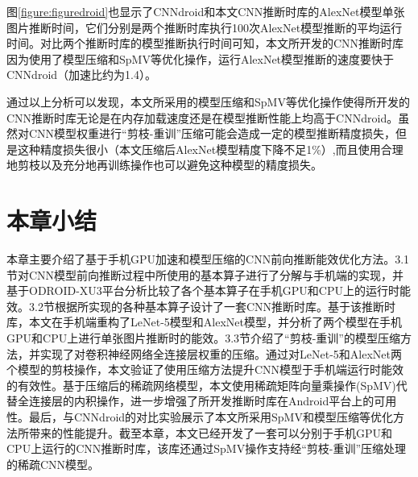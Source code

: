 图\ref{figure:figuredroid}也显示了CNNdroid和本文CNN推断时库的AlexNet模型单张图片推断时间，它们分别是两个推断时库执行100次AlexNet模型推断的平均运行时间。对比两个推断时库的模型推断执行时间可知，本文所开发的CNN推断时库因为使用了模型压缩和SpMV等优化操作，运行AlexNet模型推断的速度要快于CNNdroid（加速比约为1.4）。

通过以上分析可以发现，本文所采用的模型压缩和SpMV等优化操作使得所开发的CNN推断时库无论是在内存加载速度还是在模型推断性能上均高于CNNdroid。虽然对CNN模型权重进行“剪枝-重训”压缩可能会造成一定的模型推断精度损失，但是这种精度损失很小（本文压缩后AlexNet模型精度下降不足1\%）,而且使用合理地剪枝以及充分地再训练操作也可以避免这种模型的精度损失。




\section{本章小结}

本章主要介绍了基于手机GPU加速和模型压缩的CNN前向推断能效优化方法。3.1节对CNN模型前向推断过程中所使用的基本算子进行了分解与手机端的实现，并基于ODROID-XU3平台分析比较了各个基本算子在手机GPU和CPU上的运行时能效。3.2节根据所实现的各种基本算子设计了一套CNN推断时库。基于该推断时库，本文在手机端重构了LeNet-5模型和AlexNet模型，并分析了两个模型在手机GPU和CPU上进行单张图片推断时的能效。3.3节介绍了“剪枝-重训”的模型压缩方法，并实现了对卷积神经网络全连接层权重的压缩。通过对LeNet-5和AlexNet两个模型的剪枝操作，本文验证了使用压缩方法提升CNN模型于手机端运行时能效的有效性。基于压缩后的稀疏网络模型，本文使用稀疏矩阵向量乘操作(SpMV)代替全连接层的内积操作，进一步增强了所开发推断时库在Android平台上的可用性。最后，与CNNdroid的对比实验展示了本文所采用SpMV和模型压缩等优化方法所带来的性能提升。截至本章，本文已经开发了一套可以分别于手机GPU和CPU上运行的CNN推断时库，该库还通过SpMV操作支持经“剪枝-重训”压缩处理的稀疏CNN模型。

\cleardoublepage
